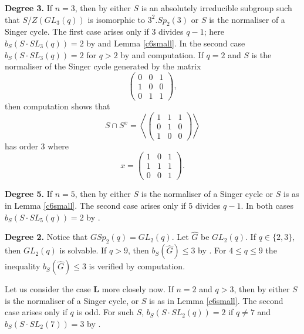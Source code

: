 {\bf Degree 3.} If $n=3$, then by \cite[\S 21.3]{sup} either $S$ is an absolutely irreducible subgroup such that $S/Z(GL_3(q))$ is isomorphic to $3^2.Sp_2(3)$ or $S$ is the normaliser of a Singer cycle.  The  first case arises only if 3 divides  $q-1$; here  $b_S(S \cdot SL_3(q))=2$  by \cite[Table 2]{burness} and Lemma \ref{c6small}.  In the second case $b_S(S \cdot SL_3(q))=2$ for $q>2$ by \cite[Table 2]{burness} and computation. 
If $q=2$ and $S$ is the normaliser of the Singer cycle generated by the matrix 
$$ \begin{pmatrix}
0    & 0 & 1  \\
1 &0    & 0  \\
  0&    1    &   1      
\end{pmatrix},$$ then computation shows that 
$$ S\cap S^x = \left\langle
 \begin{pmatrix}
1    & 1 & 1  \\
0 &1    & 0  \\
  1&    0    &   0      
\end{pmatrix} 
\right\rangle $$
has order 3 where $$
x= \begin{pmatrix}
1    & 0 & 1  \\
1 &1    & 1  \\
  0&    0    &   1      
\end{pmatrix}.$$
\medskip

{\bf Degree 5.} If $n=5$, then by \cite[\S 21.3]{sup} either $S$ is the normaliser of a Singer cycle or $S$ is as in Lemma \ref{c6small}. %
 The  second case arises only if 5 divides  $q-1$. In both cases  $b_S(S \cdot SL_5(q))=2$  by \cite[Table 2]{burness}. 
\medskip

{\bf Degree 2.} Notice that $GSp_2(q)=GL_2(q).$ Let $\hat{G}$ be $GL_2(q)$.  If $q \in \{2,3\},$ then $GL_2(q)$ is solvable. If $q>9$, then $b_S(\hat{G}) \le 3$  by \cite[Table 2]{burness}. For $4 \le q \le 9$ the inequality  $b_S(\hat{G}) \le 3$ is verified by computation.

 Let us consider the case {\bf L} more closely now. If $n=2$ and $q>3$, then by \cite[\S 21.3]{sup} either $S$ is the normaliser of a Singer cycle, or $S$  is as in Lemma \ref{c6small}. The  second case arises only if $q$ is odd. For such $S$,  $b_S(S \cdot SL_2(q))=2$ if $q \ne 7$ and $b_S(S \cdot SL_2(7))=3$ by \cite[Table 2]{burness}. 

